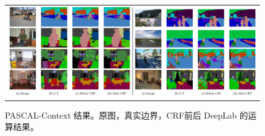 \begin{figure}[!t]
  \centering
  \scalebox{0.9} {
  \begin{tabular}{c}
    \includegraphics[width=1\linewidth]{fig/pascal_context/results.jpg} \\
  \end{tabular}
  }
  \caption{PASCAL-Context 结果。原图，真实边界，CRF前后 DeepLab 的运算结果。}
  \label{fig:pascal_context_val_results}
\end{figure}

